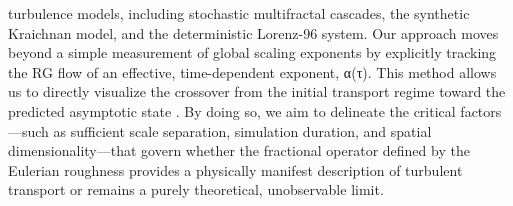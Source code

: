 \documentclass[]{article}
\begin{document}
turbulence models, including stochastic multifractal cascades, the synthetic Kraichnan model, and the deterministic Lorenz-96 system. Our approach moves beyond a simple measurement of global scaling exponents by explicitly tracking the RG flow of an effective, time-dependent exponent, α(τ). This method allows us to directly visualize the crossover from the initial transport regime toward the predicted asymptotic state  \citep{majdoub2025longtimeasymptoticssubordinatedfractional}. By doing so, we aim to delineate the critical factors—such as sufficient scale separation, simulation duration, and spatial dimensionality—that govern whether the fractional operator defined by the Eulerian roughness provides a physically manifest description of turbulent transport or remains a purely theoretical, unobservable limit.
\end{document}
